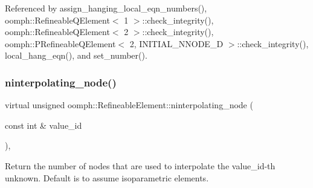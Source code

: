 Referenced by assign\+\_\+hanging\+\_\+local\+\_\+eqn\+\_\+numbers(), oomph\+::\+Refineable\+Q\+Element$<$ 1 $>$\+::check\+\_\+integrity(), oomph\+::\+Refineable\+Q\+Element$<$ 2 $>$\+::check\+\_\+integrity(), oomph\+::\+P\+Refineable\+Q\+Element$<$ 2, I\+N\+I\+T\+I\+A\+L\+\_\+\+N\+N\+O\+D\+E\+\_\+D $>$\+::check\+\_\+integrity(), local\+\_\+hang\+\_\+eqn(), and set\+\_\+number().

\mbox{\label{classoomph_1_1RefineableElement_a8b1b5031b55141567ba24913a21534f4}} 
\subsubsection{\texorpdfstring{ninterpolating\+\_\+node()}{ninterpolating\_node()}}
{\footnotesize\ttfamily virtual unsigned oomph\+::\+Refineable\+Element\+::ninterpolating\+\_\+node (\begin{DoxyParamCaption}\item[{const int \&}]{value\+\_\+id }\end{DoxyParamCaption})\hspace{0.3cm}{\ttfamily [inline]}, {\ttfamily [virtual]}}



Return the number of nodes that are used to interpolate the value\+\_\+id-\/th unknown. Default is to assume isoparametric elements. 



